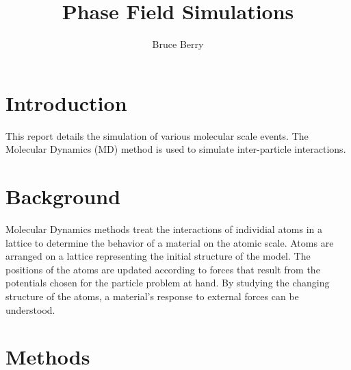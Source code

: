 \documentclass{report}
\begin{document}
    \title{Phase Field Simulations}
    \author{Bruce Berry}
    \maketitle

    \section{Introduction}
    This report details the simulation of various molecular scale events.  The Molecular Dynamics (MD) method is used to simulate inter-particle interactions.

    \section{Background}
    Molecular Dynamics methods treat the interactions of individial atoms in a lattice to determine the behavior of a material on the atomic scale.  Atoms are arranged on a lattice representing the initial structure of the model.  The positions of the atoms are updated according to forces that result from the potentials chosen for the particle problem at hand.  By studying the changing structure of the atoms, a material's response to external forces can be understood.

    \section{Methods}
\end{document}
